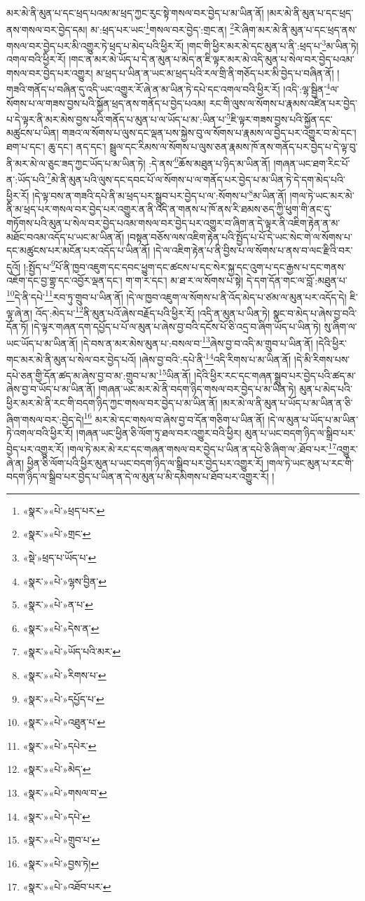 མར་མེ་ནི་མུན་པ་དང་ཕྲད་པའམ་མ་ཕྲད་ཀྱང་རུང་སྟེ་གསལ་བར་བྱེད་པ་མ་ཡིན་ནོ། །མར་མེ་ནི་མུན་པ་དང་ཕྲད་ནས་གསལ་བར་བྱེད་དམ། མ་:ཕྲད་པར་ཡང་\footnote{«སྣར་»«པེ་»ཕྲད་པར་}གསལ་བར་བྱེད་:གྲང་ན། \footnote{«སྣར་»«པེ་»གྲང་}རེ་ཞིག་མར་མེ་ནི་མུན་པ་དང་ཕྲད་ནས་གསལ་བར་བྱེད་པར་མི་འགྱུར་ཏེ་ཕྲད་པ་མེད་པའི་ཕྱིར་རོ། །གང་གི་ཕྱིར་མར་མེ་དང་མུན་པ་ནི་:ཕྲད་པ་\footnote{«སྡེ་»ཕྲད་པ་ཡོད་པ་}མ་ཡིན་ཏེ། འགལ་བའི་ཕྱིར་རོ། །གང་ན་མར་མེ་ཡོད་པ་དེ་ན་མུན་པ་མེད་ན་ཇི་ལྟར་མར་མེ་འདི་མུན་པ་སེལ་བར་བྱེད་པའམ་གསལ་བར་བྱེད་པར་འགྱུར། མ་ཕྲད་པ་ཡིན་ན་ཡང་མ་ཕྲད་པའི་རལ་གྲི་ནི་གཅོད་པར་མི་བྱེད་པ་བཞིན་ནོ། །གཟའི་གནོད་པ་བཞིན་དུ་འདི་ཡང་འགྱུར་རོ་ཞེ་ན་མ་ཡིན་ཏེ་དཔེ་དང་འགལ་བའི་ཕྱིར་རོ། །འདི་:ལྷ་སྦྱིན་\footnote{«སྣར་»«པེ་»ལྷས་བྱིན་}ལ་སོགས་པ་ལ་གཟས་བྱས་པའི་སྐྱོན་ཕྲད་ནས་གནོད་པ་བྱེད་པའམ། རང་གི་ལུས་ལ་སོགས་པ་རྣམས་འཛིན་པར་བྱེད་པ་དེ་ལྟར་ནི་མར་མེས་བྱས་པའི་གནོད་པ་མུན་པ་ལ་ཡོད་པ་མ་:ཡིན་པ་\footnote{«སྣར་»«པེ་»ན་པ་}ཇི་ལྟར་གཟས་བྱས་པའི་སྐྱོན་དང་མཚུངས་པ་ཡིན། གཟའ་ལ་སོགས་པ་ལུས་དང་ལྡན་པས་སྐྱེས་བུ་ལ་སོགས་པ་རྣམས་ལ་བྱེད་པར་འགྱུར་བ་མེ་དང་། ཐག་པ་དང་། ཆུ་དང་། ནད་དང་། སྦྲུལ་དང་རིམས་ལ་སོགས་པ་ལུས་ཅན་རྣམས་ཁོ་ནས་གནོད་པར་བྱེད་པ་དེ་ལྟ་བུ་ནི་མར་མེ་ལ་ཅུང་ཟད་ཀྱང་ཡོད་པ་མ་ཡིན་ཏེ། :དེ་ནས་\footnote{«སྣར་»«པེ་»དེས་ན་}ཆོས་མཐུན་པ་ཉིད་མ་ཡིན་ནོ། །གཞན་ཡང་ཐག་རིང་པོ་ན་:ཡོད་པའི་\footnote{«སྣར་»«པེ་»ཡོད་པའི་མར་}མེ་ནི་མུན་པའི་ལུས་དང་དབང་པོ་ལ་སོགས་པ་ལ་གནོད་པར་བྱེད་པ་མ་ཡིན་ཏེ་དེ་དག་མེད་པའི་ཕྱིར་རོ། །དེ་ལྟ་བས་ན་གཟའི་དཔེ་ནི་མ་ཕྲད་པར་སྒྲུབ་པར་བྱེད་པ་ལ་:སོགས་པ་\footnote{«སྣར་»«པེ་»རིགས་པ་}མ་ཡིན་ནོ། །གལ་ཏེ་ཡང་མར་མེ་ནི་མ་ཕྲད་པར་གསལ་བར་བྱེད་པར་འགྱུར་ན་ནི་འདི་ན་གནས་པ་ཁོ་ནས་རི་ཐམས་ཅད་ཀྱི་ཕུག་གི་ནང་དུ་གཏོགས་པའི་མུན་པ་སེལ་བར་བྱེད་པའམ་གསལ་བར་བྱེད་པར་འགྱུར་བ་ཞིག་ན་དེ་ལྟར་ནི་འཇིག་རྟེན་ན་མ་མཐོང་བའམ་འདོད་པ་ཡང་མ་ཡིན་ནོ། །བསྟན་བཅོས་ལས་འཇིག་རྟེན་པའི་སྤྱོད་པ་པོ་དེ་ཡང་སེང་གེ་ལ་སོགས་པ་དང་མཚུངས་པར་མངོན་པར་འདོད་པ་ཡིན་ནོ། །དེ་ལ་འཇིག་རྟེན་པ་ནི་བྱིས་པ་ལ་སོགས་པ་ནས་བ་ལང་རྫིའི་བར་དུའོ། །:སྤྱོད་པ་\footnote{«སྣར་»«པེ་»དཔྱོད་པ་}པོ་ནི་ཁྱབ་འཇུག་དང་དབང་ཕྱུག་དང་ཚངས་པ་དང་སེར་སྐྱ་དང་འུག་པ་དང་རྒྱས་པ་དང་གནས་འཇོག་དང་བྱ་གྷྲ་དང་འབྱོར་ལྡན་དང་། ག་ག་ར་དང་། མ་ཐ་ར་ལ་སོགས་པ་སྟེ། དེ་དག་དོན་གང་ལ་བློ་:མཐུན་པ་\footnote{«སྣར་»«པེ་»འཐུན་པ་}དེ་ནི་དཔེ་\footnote{«སྣར་»«པེ་»དཔེར་}རབ་ཏུ་གྲུབ་པ་ཡིན་ནོ། །དེ་ལ་ཁྱབ་འཇུག་ལ་སོགས་པ་ནི་འོད་མེད་པ་ཙམ་ལ་མུན་པར་འདོད་དེ། ཇི་ལྟ་ཞེ་ན། འོད་:མེད་པ་\footnote{«སྣར་»«པེ་»མེད་}ནི་མུན་པའོ་ཞེས་བརྗོད་པའི་ཕྱིར་རོ། །འདི་ན་མུན་པ་ཡིན་ཏེ། སྣང་བ་མེད་པ་ཞེས་བྱ་བའི་དོན་ཏོ། །དེ་ལྟར་གཞན་དག་དཔྱོད་པ་པོ་ལ་མུན་པ་ཞེས་བྱ་བའི་དངོས་པོ་ཅི་འདྲ་བ་ཞིག་ཡོད་པ་ཡིན་ཏེ། སུ་ཞིག་ལ་ཡང་ཡོད་པ་མ་ཡིན་ནོ། །དེ་བས་ན་མར་མེས་མུན་པ་:བསལ་བ་\footnote{«སྣར་»«པེ་»གསལ་བ་}ཞེས་བྱ་བ་འདི་མ་གྲུབ་པ་ཡིན་ནོ། །དེའི་ཕྱིར་གང་མར་མེ་ནི་མུན་པ་སེལ་བར་བྱེད་པའོ། །ཞེས་བྱ་བའི་:དཔེ་ནི་\footnote{«སྣར་»«པེ་»དཔེ་}འདི་རིགས་པ་མ་ཡིན་ནོ། །དེ་མི་རིགས་པས་དཔེ་ཅན་གྱི་དོན་ཚད་མ་ཞེས་བྱ་བ་མ་:གྲུབ་པ་མ་\footnote{«སྣར་»«པེ་»གྲུབ་པ་}ཡིན་ནོ། །དེའི་ཕྱིར་རང་དང་གཞན་སྒྲུབ་པར་བྱེད་པའི་ཚད་མ་ཞེས་བྱ་བ་ཡོད་པ་མ་ཡིན་ནོ། །གཞན་ཡང་མར་མེ་ནི་བདག་ཉིད་གསལ་བར་བྱེད་པ་མ་ཡིན་ཏེ། མུན་པ་མེད་པའི་ཕྱིར་མར་མེ་ནི་རང་གི་བདག་ཉིད་ཀྱང་གསལ་བར་བྱེད་པ་མ་ཡིན་ནོ། །མར་མེ་ལ་ནི་མུན་པ་ཡོད་པ་མ་ཡིན་ན་ཅི་ཞིག་གསལ་བར་:བྱེད་དེ།\footnote{«སྣར་»«པེ་»བྱས་ཏེ།} མར་མེ་དང་གསལ་བ་ཞེས་བྱ་བ་དོན་གཅིག་པ་ཡིན་ནོ། །དེ་ལ་མུན་པ་ཡོད་པ་མ་ཡིན་ཏེ་འགལ་བའི་ཕྱིར་རོ། །གཞན་ཡང་ཕྱིན་ཅི་ལོག་ཏུ་ཐལ་བར་འགྱུར་བའི་ཕྱིར། མུན་པ་ཡང་བདག་ཉིད་ལ་སྒྲིབ་པར་བྱེད་པར་འགྱུར་རོ། །གལ་ཏེ་མར་མེ་རང་དང་གཞན་གསལ་བར་བྱེད་པ་ཡིན་ན་དཔེ་ཅི་ཞིག་ལ་:ཐོབ་པར་\footnote{«སྣར་»«པེ་»འཐོབ་པར་}འགྱུར་ཞེ་ན། ཕྱིན་ཅི་ལོག་པའི་ཕྱིར་མུན་པ་ཡང་བདག་ཉིད་ལ་སྒྲིབ་པར་བྱེད་པར་འགྱུར་རོ། །གལ་ཏེ་ཡང་མུན་པ་རང་གི་བདག་ཉིད་ལ་སྒྲིབ་པར་བྱེད་པ་ཡིན་ན་དེ་ལ་མུན་པ་མི་དམིགས་པ་ཐོབ་པར་འགྱུར་རོ། །
